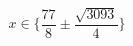 \documentclass{article}
\begin{document}
\begin{adjustwidth}{-3cm}{-3cm}


\newenvironment{enumeratebf}{
    \begin{enumerate}[label=\textbf{\arabic*.}]
}
{
    \end{enumerate}
}

\newcommand{\notion}[1]{\textcolor{vert_fonce}{\textit{#1}}}
\newcommand{\mb}[1]{\mathbb{#1}}
\newcommand{\mc}[1]{\mathcal{#1}}
\newcommand{\code}[1]{\texttt{#1}}
\newcommand{\ccode}[1]{\texttt{|#1|}}
\newcommand{\ov}[1]{\overline{#1}}
\newcommand{\abs}[1]{|#1|}
\newcommand{\rev}[1]{\texttt{reverse(#1)}}
\newcommand{\crev}[1]{\texttt{|reverse(#1)|}}

\newcommand{\ie}{\textit{i.e.} }

\newcommand{\N}{\mathbb{N}}
\newcommand{\R}{\mathbb{R}}
\newcommand{\C}{\mathbb{C}}
\newcommand{\K}{\mathbb{K}}

\newcommand{\A}{\mathcal{A}}
\newcommand{\bigO}{\mathcal{O}}
\renewcommand{\L}{\mathcal{L}}

\newcommand{\rg}[0]{\text{rg}}
\newcommand{\re}[0]{\text{Re}}
\newcommand{\im}[0]{\text{Im}}
\newcommand{\mat}[1]{\text{Mat}_{#1}}
\newcommand{\matrice}[1]{\mathcal{M}_{#1}}
\newcommand{\norme}[1]{||#1||}
\renewcommand{\d}[1]{\,\text{d}#1}
\newcommand{\intint}[2]{\llbracket #1 ,\, #2 \rrbracket}
\newcommand{\seg}[2]{[#1\, ; \, #2]}
\newcommand{\scal}[2]{\left\langle #1 ,\, #2 \right\rangle}
\newcommand{\inte}[2]{\int_{#1}^{#2}}
\newcommand{\somme}[2]{\sum_{#1}^{#2}}

$$x \in \{\frac{77}{8} \pm \frac{\sqrt{3093}}{4}\}$$


\end{adjustwidth}
\end{document}
